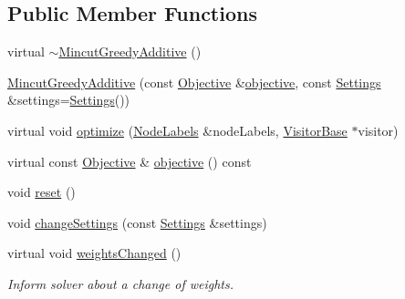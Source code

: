 \subsection*{Public Member Functions}
\begin{DoxyCompactItemize}
\item 
virtual \hyperlink{classnifty_1_1graph_1_1mincut_1_1MincutGreedyAdditive_a35df3e684654a0bdde00972e63a1346e}{$\sim$\+Mincut\+Greedy\+Additive} ()
\item 
\hyperlink{classnifty_1_1graph_1_1mincut_1_1MincutGreedyAdditive_aae144506bd7ffcf1c7bb897df3b345a7}{Mincut\+Greedy\+Additive} (const \hyperlink{classnifty_1_1graph_1_1mincut_1_1MincutGreedyAdditive_a53eab6ae6b54a84335e3715d197c203b}{Objective} \&\hyperlink{classnifty_1_1graph_1_1mincut_1_1MincutGreedyAdditive_aae313d20482c31134ac21fcaf3003756}{objective}, const \hyperlink{classnifty_1_1graph_1_1mincut_1_1MincutGreedyAdditive_a84b2901edebe3443a37f41e1ba254b9d}{Settings} \&settings=\hyperlink{classnifty_1_1graph_1_1mincut_1_1MincutGreedyAdditive_a84b2901edebe3443a37f41e1ba254b9d}{Settings}())
\item 
virtual void \hyperlink{classnifty_1_1graph_1_1mincut_1_1MincutGreedyAdditive_aa712fec02f5d56e613ac4a2734952ee3}{optimize} (\hyperlink{classnifty_1_1graph_1_1mincut_1_1MincutGreedyAdditive_a462b79779cfbe6ddd82b9e85097ddd3c}{Node\+Labels} \&node\+Labels, \hyperlink{classnifty_1_1graph_1_1MincutBase_a5ba378dc5a1fc073eb9449ca635e7648}{Visitor\+Base} $\ast$visitor)
\item 
virtual const \hyperlink{classnifty_1_1graph_1_1mincut_1_1MincutGreedyAdditive_a53eab6ae6b54a84335e3715d197c203b}{Objective} \& \hyperlink{classnifty_1_1graph_1_1mincut_1_1MincutGreedyAdditive_aae313d20482c31134ac21fcaf3003756}{objective} () const 
\item 
void \hyperlink{classnifty_1_1graph_1_1mincut_1_1MincutGreedyAdditive_a6739c4b959e7cca8771dede1d110e87b}{reset} ()
\item 
void \hyperlink{classnifty_1_1graph_1_1mincut_1_1MincutGreedyAdditive_ad6fc3c99788da6017d4c90a1f48db835}{change\+Settings} (const \hyperlink{classnifty_1_1graph_1_1mincut_1_1MincutGreedyAdditive_a84b2901edebe3443a37f41e1ba254b9d}{Settings} \&settings)
\item 
virtual void \hyperlink{classnifty_1_1graph_1_1mincut_1_1MincutGreedyAdditive_a94a006441dedf25f4b57474a32328e2b}{weights\+Changed} ()
\begin{DoxyCompactList}\small\item\em Inform solver about a change of weights. \end{DoxyCompactList}\item 

\end{DoxyCompactItemize}
